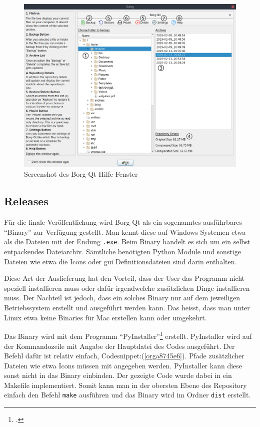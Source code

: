 \begin{landscape}
\begin{figure}
\centering
\includegraphics[width=17cm]{pictures/borgqt_help.png}
\caption{\label{fig:orgf44d24c}
Screenshot des Borg-Qt Hilfe Fenster}
\end{figure}
\end{landscape}

\newpage
\subsection{Releases}
\label{sec:org3adb3b3}

Für die finale Veröffentlichung wird Borg-Qt als ein sogenanntes ausführbares
"`Binary"' zur Verfügung gestellt. Man kennt diese auf Windows Systemen etwa als
die Dateien mit der Endung \texttt{.exe}. Beim Binary handelt es sich um ein selbst
entpackendes Dateiarchiv. Sämtliche benötigten Python Module und sonstige
Dateien wie etwa die Icons oder \gls{gui} Definitionsdateien sind darin
enthalten.

Diese Art der Auslieferung hat den Vorteil, dass der User das Programm nicht
speziell installieren muss oder dafür irgendwelche zusätzlichen Dinge
installieren muss. Der Nachteil ist jedoch, dass ein solches Binary nur auf dem
jeweiligen Betriebssystem erstellt und ausgeführt werden kann. Das heisst, dass
man unter Linux etwa keine Binaries für Mac erstellen kann oder umgekehrt.

Das Binary wird mit dem Programm "`PyInstaller"'\footcite{pyinstaller} erstellt.
PyInstaller wird auf der Kommandozeile mit Angabe der Hauptdatei des Codes
ausgeführt. Der Befehl dafür ist relativ einfach,
Codesnippet:(\ref{orga8745e6}). Pfade zusätzlicher Dateien wie etwa Icons
müssen mit angegeben werden. PyInstaller kann diese sonst nicht in das Binary
einbinden. Der gezeigte Code wurde dabei in ein Makefile implementiert. Somit
kann man in der obersten Ebene des Repository einfach den Befehl \texttt{make}
ausführen und das Binary wird im Ordner \texttt{dist} erstellt.

